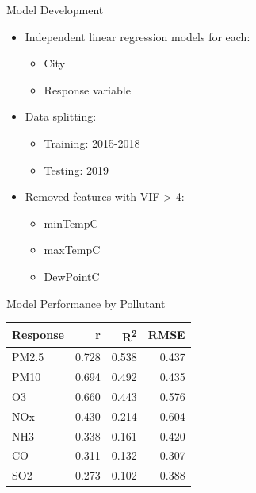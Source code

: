 \documentclass[svgnames, 10pt]{beamer}
\begin{document}
\begin{frame}{Model Development}
\begin{itemize}
    \item Independent linear regression models for each:
        \begin{itemize}
            \item City
            \item Response variable
        \end{itemize}
    \item Data splitting:
        \begin{itemize}
            \item Training: 2015-2018
            \item Testing: 2019
        \end{itemize}
    \item Removed features with VIF > 4:
        \begin{itemize}
            \item minTempC
            \item maxTempC
            \item DewPointC
        \end{itemize}
\end{itemize}
\end{frame}

\begin{frame}{Model Performance by Pollutant}
    \begin{table}
    \centering
    \begin{tabular}{lrrr}
    \hline
    Response & r & R\textsuperscript{2} & RMSE \\
    \hline
    PM2.5 & 0.728 & 0.538 & 0.437 \\
    PM10 & 0.694 & 0.492 & 0.435 \\
    O3 & 0.660 & 0.443 & 0.576 \\
    NOx & 0.430 & 0.214 & 0.604 \\
    NH3 & 0.338 & 0.161 & 0.420 \\
    CO & 0.311 & 0.132 & 0.307 \\
    SO2 & 0.273 & 0.102 & 0.388 \\
    \hline
    \end{tabular}
    \end{table}
    \end{frame}
    
\end{document}
